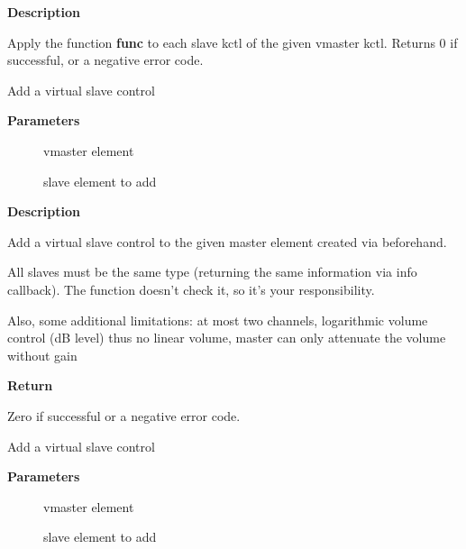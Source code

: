 \documentclass[a4paper,8pt,english]{sphinxmanual}
\begin{document}
\textbf{Description}

Apply the function \textbf{func} to each slave kctl of the given vmaster kctl.
Returns 0 if successful, or a negative error code.

\begin{fulllineitems}
\label{sound/kernel-api/alsa-driver-api:c.snd_ctl_add_slave}
Add a virtual slave control

\end{fulllineitems}


\textbf{Parameters}
\begin{description}
\item[{}] \leavevmode
vmaster element

\item[{}] \leavevmode
slave element to add

\end{description}

\textbf{Description}

Add a virtual slave control to the given master element created via
 beforehand.

All slaves must be the same type (returning the same information
via info callback).  The function doesn't check it, so it's your
responsibility.

Also, some additional limitations:
at most two channels,
logarithmic volume control (dB level) thus no linear volume,
master can only attenuate the volume without gain

\textbf{Return}

Zero if successful or a negative error code.

\begin{fulllineitems}
\label{sound/kernel-api/alsa-driver-api:c.snd_ctl_add_slave_uncached}
Add a virtual slave control

\end{fulllineitems}


\textbf{Parameters}
\begin{description}
\item[{}] \leavevmode
vmaster element

\item[{}] \leavevmode
slave element to add

\end{description}
\end{document}
